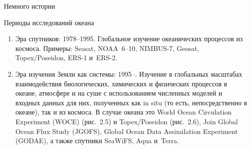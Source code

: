 \begin{chapter}{Немного истории}
\begin{section}{Периоды исследований океана}
\begin{enumerate}

\item
Эра спутников: 1978--1995. Глобальное
изучение океанических процессов из космоса. Примеры: Seasat, 
NOAA~6--10, NIMBUS-7, Geosat, Topex/Poseidon, ERS-1 и~ERS-2.
%

\item
Эра изучения Земли как системы: 1995--. Изучение в глобальных масштабах
взаимодействия биологических, химических и физических
процессов в океане, атмосфере и на суше с использованием численных моделей
и входных данных для них, полученных как in situ (то есть, непосредственно 
в океане), так и из космоса. В случае океана это
World Ocean Circulation Experiment (WOCE) (рис.~2.5) 
и Topex/Poseidon (рис.~2.6), Join Global
Ocean Flux Study (JGOFS), Global Ocean Data Assimilation Experiment (GODAE),
а также спутники SeaWiFS, Aqua и~Terra.
%
\end{enumerate}




\end{section}
\end{chapter}
